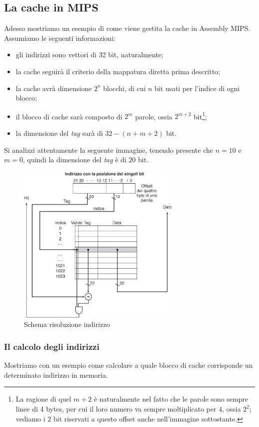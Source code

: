 \documentclass[class=book, crop=false, oneside]{standalone}
\begin{document}
\subsection{La cache in MIPS}
Adesso mostriamo un esempio di come viene gestita la cache in Assembly MIPS. Assumiamo le seguenti informazioni:
\begin{itemize}
	\item gli indirizzi sono vettori di 32 bit, naturalmente;
	\item la cache seguirà il criterio della mappatura diretta prima descritto;
	\item la cache avrà dimensione \(2^{n}\) blocchi, di cui \(n\) bit usati per l'indice di ogni blocco;
	\item il blocco di cache sarà composto di \(2^{m}\) parole, ossia \(2^{m+2}\) bit\footnote{La ragione di quel \(m + 2\) è naturalmente nel fatto che le parole sono sempre linee di 4 bytes, per cui il loro numero va sempre moltiplicato per \(4\), ossia \(2^{2}\); vediamo i \(2\) bit riservati a questo offset anche nell'immagine sottostante.};
	\item la dimensione del \emph{tag} sarà di \(32-(n+m+2)\) bit.
\end{itemize}
Si analizzi attentamente la seguente immagine, tenendo presente che \(n=10\) e \(m=0\), quindi la dimensione del \emph{tag} è di \(20\) bit.

\begin{figure}[H]
	\centering
	\includegraphics[width=0.7\textwidth,keepaspectratio]{mipscache.png}
	\caption{Schema risoluzione indirizzo}
\end{figure}

\subsubsection{Il calcolo degli indirizzi}
Mostriamo con un esempio come calcolare a quale blocco di cache corrisponde un determinato indirizzo in memoria.
\end{document}
